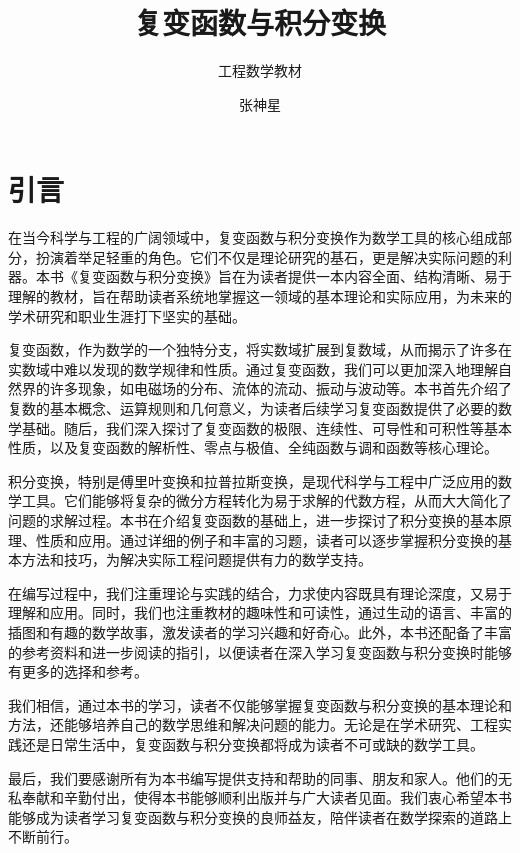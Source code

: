 \documentclass[11pt,a4paper,twoside,openright,scheme=chinese]{ctexbook}
\title{复变函数与积分变换}
\subtitle{工程数学教材}
\author{张神星}
\begin{document}
\maketitle

\hypersetup{pageanchor=true}
\frontmatter

\chapter*{引\qquad 言}

在当今科学与工程的广阔领域中，复变函数与积分变换作为数学工具的核心组成部分，扮演着举足轻重的角色。它们不仅是理论研究的基石，更是解决实际问题的利器。本书《复变函数与积分变换》旨在为读者提供一本内容全面、结构清晰、易于理解的教材，旨在帮助读者系统地掌握这一领域的基本理论和实际应用，为未来的学术研究和职业生涯打下坚实的基础。

复变函数，作为数学的一个独特分支，将实数域扩展到复数域，从而揭示了许多在实数域中难以发现的数学规律和性质。通过复变函数，我们可以更加深入地理解自然界的许多现象，如电磁场的分布、流体的流动、振动与波动等。本书首先介绍了复数的基本概念、运算规则和几何意义，为读者后续学习复变函数提供了必要的数学基础。随后，我们深入探讨了复变函数的极限、连续性、可导性和可积性等基本性质，以及复变函数的解析性、零点与极值、全纯函数与调和函数等核心理论。

积分变换，特别是傅里叶变换和拉普拉斯变换，是现代科学与工程中广泛应用的数学工具。它们能够将复杂的微分方程转化为易于求解的代数方程，从而大大简化了问题的求解过程。本书在介绍复变函数的基础上，进一步探讨了积分变换的基本原理、性质和应用。通过详细的例子和丰富的习题，读者可以逐步掌握积分变换的基本方法和技巧，为解决实际工程问题提供有力的数学支持。

在编写过程中，我们注重理论与实践的结合，力求使内容既具有理论深度，又易于理解和应用。同时，我们也注重教材的趣味性和可读性，通过生动的语言、丰富的插图和有趣的数学故事，激发读者的学习兴趣和好奇心。此外，本书还配备了丰富的参考资料和进一步阅读的指引，以便读者在深入学习复变函数与积分变换时能够有更多的选择和参考。

我们相信，通过本书的学习，读者不仅能够掌握复变函数与积分变换的基本理论和方法，还能够培养自己的数学思维和解决问题的能力。无论是在学术研究、工程实践还是日常生活中，复变函数与积分变换都将成为读者不可或缺的数学工具。

最后，我们要感谢所有为本书编写提供支持和帮助的同事、朋友和家人。他们的无私奉献和辛勤付出，使得本书能够顺利出版并与广大读者见面。我们衷心希望本书能够成为读者学习复变函数与积分变换的良师益友，陪伴读者在数学探索的道路上不断前行。
\end{document}
